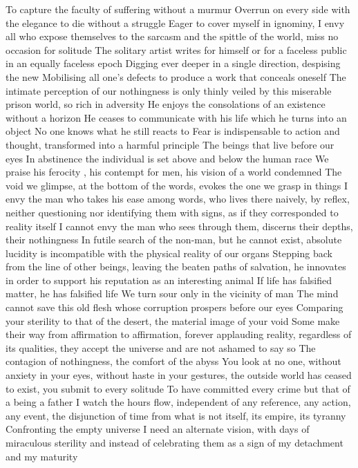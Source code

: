 \documentclass{article}
\begin{document}
To capture the faculty of suffering without a murmur
Overrun on every side with the elegance to die without a struggle
Eager to cover myself in ignominy, I envy all who expose themselves to the sarcasm and the spittle of the world, miss no occasion for solitude
The solitary artist writes for himself or for a faceless public in an equally faceless epoch
Digging ever deeper in a single direction, despising the new
Mobilising all one's defects to produce a work that conceals oneself
The intimate perception of our nothingness is only thinly veiled by this miserable prison world, so rich in adversity
He enjoys the consolations of an existence without a horizon
He ceases to communicate with his life which he turns into an object
No one knows what he still reacts to
Fear is indispensable  to action and thought, transformed into a harmful principle
The beings that live before our eyes
In abstinence the individual is set above and below the human race
We praise his ferocity , his contempt for men, his vision of a world condemned
The void we glimpse, at the bottom of the words, evokes the one we grasp in things
I envy the man who takes his ease among words, who lives there naively, by reflex, neither questioning nor identifying them with signs, as if they corresponded to reality itself
I cannot envy the man who sees through them, discerns their depths, their nothingness
In futile search of the non-man, but he cannot exist, absolute lucidity is incompatible with the physical reality of our organs
Stepping back from the line of other beings, leaving the beaten paths of salvation, he innovates in order to support his reputation as an interesting animal
If life has falsified matter, he has falsified life
We turn sour only in the vicinity of man
The mind cannot save this old flesh whose corruption prospers before our eyes
Comparing your sterility to that of the desert, the material image of your void
Some make their way from affirmation to affirmation, forever applauding reality, regardless of its qualities, they accept the universe and are not ashamed to say so
The contagion of nothingness, the comfort of the abyss
You look at no one, without anxiety in your eyes, without haste in your gestures, the outside world has ceased to exist, you submit to every solitude
To have committed every crime but that of a being a father
I watch the hours flow, independent of any reference, any action, any event, the disjunction of time from what is not itself, its empire, its tyranny
Confronting the empty universe
I need an alternate vision, with days of miraculous sterility and instead of celebrating them as a sign of my detachment and my maturity
\end{document}
